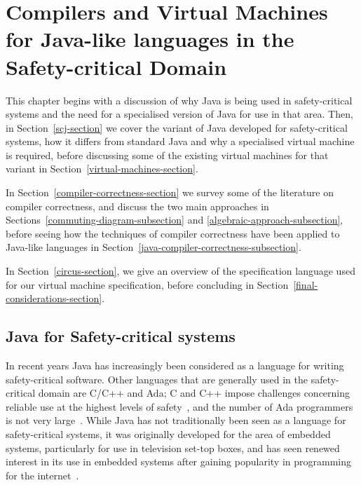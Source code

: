 \chapter{Compilers and Virtual Machines for Java-like languages in the
  Safety-critical Domain}
\label{literature-review-chapter}

This chapter begins with a discussion of why Java is being used in
safety-critical systems and the need for a specialised version of Java
for use in that area.
Then, in Section~\ref{scj-section} we cover the variant of Java
developed for safety-critical systems, how it differs from standard
Java and why a specialised virtual machine is required, before
discussing some of the existing virtual machines for that variant in
Section~\ref{virtual-machines-section}.

In Section~\ref{compiler-correctness-section} we survey some of the
literature on compiler correctness, and discuss the two main
approaches in Sections~\ref{commuting-diagram-subsection} and
\ref{algebraic-approach-subsection}, before seeing how the techniques
of compiler correctness have been applied to Java-like languages in
Section~\ref{java-compiler-correctness-subsection}.

In Section~\ref{circus-section}, we give an overview of the \Circus{}
specification language used for our virtual machine specification,
before concluding in Section~\ref{final-considerations-section}.

\section{Java for Safety-critical systems}
\label{java-safety-critical-section}


In recent years Java has increasingly been considered as a language
for writing safety-critical software.
Other languages that are generally used in the safety-critical domain
are C/C++ and Ada; C and C++ impose challenges concerning reliable use
at the highest levels of safety~\cite{kornecki2009}, and the number of
Ada programmers is not very large~\cite{bissyande2013}.
While Java has not traditionally been seen as a language for
safety-critical systems, it was originally developed for the area of
embedded systems, particularly for use in television set-top boxes,
and has seen renewed interest in its use in embedded systems after
gaining popularity in programming for the
internet~\cite{mulchandani1998}.

